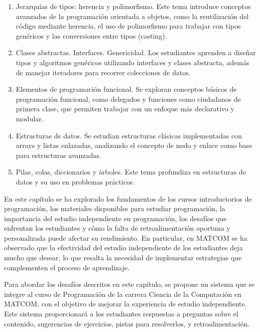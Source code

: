 \documentclass{article}
\begin{document}
\begin{enumerate}
    \item Jerarquías de tipos: herencia y polimorfismo.
    Este tema introduce conceptos avanzados de la programación orientada a objetos, como la reutilización del código mediante herencia, el uso de polimorfismo para trabajar con tipos genéricos y las conversiones entre tipos (casting).  

    \item Clases abstractas. Interfaces. Genericidad.
    Los estudiantes aprenden a diseñar tipos y algoritmos genéricos utilizando interfaces y clases abstracta, además de manejar iteradores para recorrer colecciones de datos.

    \item Elementos de programación funcional.
    Se exploran conceptos básicos de programación funcional, como delegados y funciones como ciudadanos de primera clase, que permiten trabajar con un enfoque más declarativo y modular.

    \item Estructuras de datos.
    Se estudian estructuras clásicas implementadas con arrays y listas enlazadas, analizando el concepto de nodo y enlace como base para estructuras avanzadas.  

    \item Pilas, colas, diccionarios y árboles.
    Este tema profundiza en estructuras de datos y su uso en problemas prácticos.
\end{enumerate}

En este capítulo se ha explorado los fundamentos de los cursos introductorios de programación, los materiales disponibles para estudiar programación, la importancia del estudio independiente en programación, los desafíos que enfrentan los estudiantes y cómo la falta de retroalimentación oportuna y personalizada puede afectar su rendimiento. En particular, en \mbox{MATCOM} se ha observado que la efectividad del estudio independiente de los estudiantes deja mucho que desear, lo que resalta la necesidad de implementar estrategias que complementen el proceso de aprendizaje.

Para abordar los desafíos descritos en este capítulo, se propone un sistema que se integre al curso de Programación de la carrera Ciencia de la Computación en \mbox{MATCOM}, con el objetivo de  mejorar la experiencia de estudio independiente. Este sistema proporcionará  a los estudiantes respuestas a preguntas sobre el contenido, sugerencias de ejercicios, pistas para resolverlos, y retroalimentación.
\end{document}
